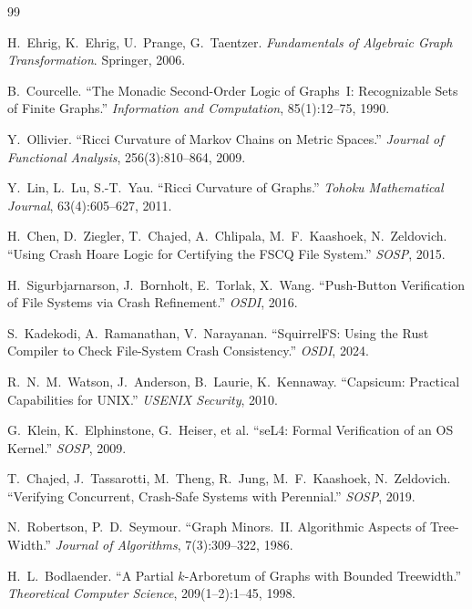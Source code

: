 \documentclass[11pt,a4paper]{article}
\theoremstyle{definition}
\begin{document}
\begin{thebibliography}{99}

H.~Ehrig, K.~Ehrig, U.~Prange, G.~Taentzer.
\emph{Fundamentals of Algebraic Graph Transformation}.
Springer, 2006.

B.~Courcelle.
``The Monadic Second-Order Logic of Graphs~I: Recognizable Sets of Finite Graphs.''
\emph{Information and Computation}, 85(1):12--75, 1990.

Y.~Ollivier.
``Ricci Curvature of Markov Chains on Metric Spaces.''
\emph{Journal of Functional Analysis}, 256(3):810--864, 2009.

Y.~Lin, L.~Lu, S.-T.~Yau.
``Ricci Curvature of Graphs.''
\emph{Tohoku Mathematical Journal}, 63(4):605--627, 2011.

H.~Chen, D.~Ziegler, T.~Chajed, A.~Chlipala, M.~F.~Kaashoek, N.~Zeldovich.
``Using Crash Hoare Logic for Certifying the FSCQ File System.''
\emph{SOSP}, 2015.

H.~Sigurbjarnarson, J.~Bornholt, E.~Torlak, X.~Wang.
``Push-Button Verification of File Systems via Crash Refinement.''
\emph{OSDI}, 2016.

S.~Kadekodi, A.~Ramanathan, V.~Narayanan.
``SquirrelFS: Using the Rust Compiler to Check File-System Crash Consistency.''
\emph{OSDI}, 2024.

R.~N.~M.~Watson, J.~Anderson, B.~Laurie, K.~Kennaway.
``Capsicum: Practical Capabilities for UNIX.''
\emph{USENIX Security}, 2010.

G.~Klein, K.~Elphinstone, G.~Heiser, et al.
``seL4: Formal Verification of an OS Kernel.''
\emph{SOSP}, 2009.

T.~Chajed, J.~Tassarotti, M.~Theng, R.~Jung, M.~F.~Kaashoek, N.~Zeldovich.
``Verifying Concurrent, Crash-Safe Systems with Perennial.''
\emph{SOSP}, 2019.

N.~Robertson, P.~D.~Seymour.
``Graph Minors.~II. Algorithmic Aspects of Tree-Width.''
\emph{Journal of Algorithms}, 7(3):309--322, 1986.

H.~L.~Bodlaender.
``A Partial $k$-Arboretum of Graphs with Bounded Treewidth.''
\emph{Theoretical Computer Science}, 209(1--2):1--45, 1998.

\end{thebibliography}
\end{document}
